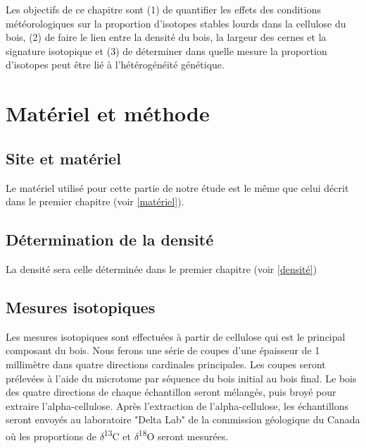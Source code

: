 \documentclass[a4paper,12pt]{report}
\newcommand{\Ctreize}{$\delta$\textsuperscript{13}C\xspace}
\newcommand{\Odixhuit}{$\delta$\textsuperscript{18}O\xspace}
\begin{document}
Les objectifs de ce chapitre sont (1) de quantifier les effets des conditions météorologiques sur la proportion d'isotopes stables lourds dans la cellulose du bois, (2) de faire le lien entre la densité du bois, la largeur des cernes et la signature isotopique et (3) de déterminer dans quelle mesure la proportion d'isotopes peut être lié à l'hétérogénéité génétique. %

\section{Matériel et méthode}

\subsection*{Site et matériel}
Le matériel utilisé pour cette partie de notre étude est le même que celui décrit dans le premier chapitre (voir \ref{matériel}).  


\subsection*{Détermination de la densité}
La densité sera celle déterminée dans le premier chapitre (voir \ref{densité})

\subsection*{Mesures isotopiques}
Les mesures isotopiques sont effectuées à partir de cellulose qui est le principal composant du bois. Nous ferons une série de coupes d'une épaisseur de 1 millimètre dans quatre directions cardinales principales. Les coupes seront prélevées à l'aide du microtome par séquence du bois initial au bois final. Le bois des quatre directions de chaque échantillon seront mélangés, puis broyé pour extraire l'alpha-cellulose. Après l'extraction de l'alpha-cellulose, les échantillons seront envoyés au laboratoire "Delta Lab" de la commission géologique du Canada où les proportions de \Ctreize et \Odixhuit seront mesurées.
\end{document}
